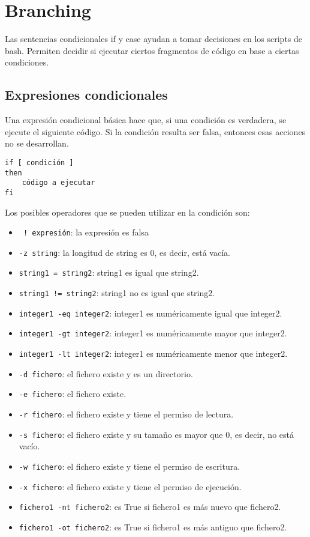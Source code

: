 \section{Branching}
Las sentencias condicionales if y case ayudan a tomar decisiones en los scripts de bash. Permiten decidir si ejecutar ciertos fragmentos de código en base a ciertas condiciones.

\subsection{Expresiones condicionales}
Una expresión condicional básica hace que, si una condición es verdadera, se ejecute el siguiente código. Si la condición resulta ser falsa, entonces esas acciones no se desarrollan.
\begin{lstlisting}
if [ condición ]
then
	código a ejecutar
fi
\end{lstlisting}

Los posibles operadores que se pueden utilizar en la condición son: \begin{itemize}
\item\texttt{ ! expresión}: la expresión es falsa
\item \texttt{-z string}: la longitud de string es 0, es decir, está vacía. 
\item \texttt{string1 = string2}: string1 es igual que string2.
\item \texttt{string1 != string2}: string1 no es igual que string2.
\item \texttt{integer1 -eq integer2}: integer1 es numéricamente igual que integer2.
\item \texttt{integer1 -gt integer2}: integer1 es numéricamente mayor que integer2.
\item \texttt{integer1 -lt integer2}: integer1 es numéricamente menor que integer2.
\item \texttt{-d fichero}: el fichero existe y es un directorio.
\item \texttt{-e fichero}: el fichero existe.
\item \texttt{-r fichero}: el fichero existe y tiene el permiso de lectura.
\item \texttt{-s fichero}: el fichero existe y su tamaño es mayor que 0, es decir, no está vacío.
\item \texttt{-w fichero}: el fichero existe y tiene el permiso de escritura.
\item \texttt{-x fichero}: el fichero existe y tiene el permiso de ejecución.
\item \texttt{fichero1 -nt fichero2}: es True si fichero1 es más nuevo que fichero2.
\item \texttt{fichero1 -ot fichero2}: es True si fichero1 es más antiguo que fichero2.
\end{itemize} 


